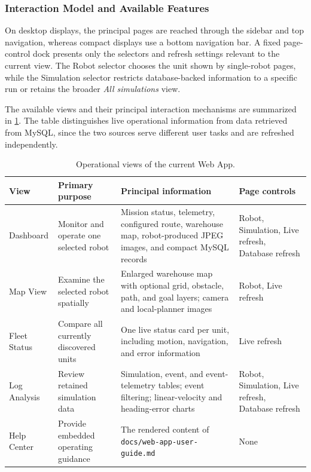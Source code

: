\subsubsection{Interaction Model and Available Features}

On desktop displays, the principal pages are reached through the sidebar and top navigation, whereas compact displays use a bottom navigation bar. A fixed page-control dock presents only the selectors and refresh settings relevant to the current view. The Robot selector chooses the unit shown by single-robot pages, while the Simulation selector restricts database-backed information to a specific run or retains the broader \emph{All simulations} view.

The available views and their principal interaction mechanisms are summarized in \cref{tab:webapp-operational-views}. The table distinguishes live operational information from data retrieved from MySQL, since the two sources serve different user tasks and are refreshed independently.

\begin{table}[H]
  \centering
  \caption{Operational views of the current Web App.}
  \label{tab:webapp-operational-views}
  \begin{tabularx}{\textwidth}{@{}>{\raggedright\arraybackslash}p{} X X >{\raggedright\arraybackslash}p{}@{}}
    \toprule
    \textbf{View} & \textbf{Primary purpose} & \textbf{Principal information} & \textbf{Page controls} \\
    \midrule
    Dashboard & Monitor and operate one selected robot & Mission status, telemetry, configured route, warehouse map, robot-produced JPEG images, and compact MySQL records & Robot, Simulation, Live refresh, Database refresh \\
    Map View & Examine the selected robot spatially & Enlarged warehouse map with optional grid, obstacle, path, and goal layers; camera and local-planner images & Robot, Live refresh \\
    Fleet Status & Compare all currently discovered units & One live status card per unit, including motion, navigation, and error information & Live refresh \\
    Log Analysis & Review retained simulation data & Simulation, event, and event-telemetry tables; event filtering; linear-velocity and heading-error charts & Robot, Simulation, Live refresh, Database refresh \\
    Help Center & Provide embedded operating guidance & The rendered content of \texttt{docs/web-app-user-guide.md} & None \\
    \bottomrule
  \end{tabularx}
\end{table}

